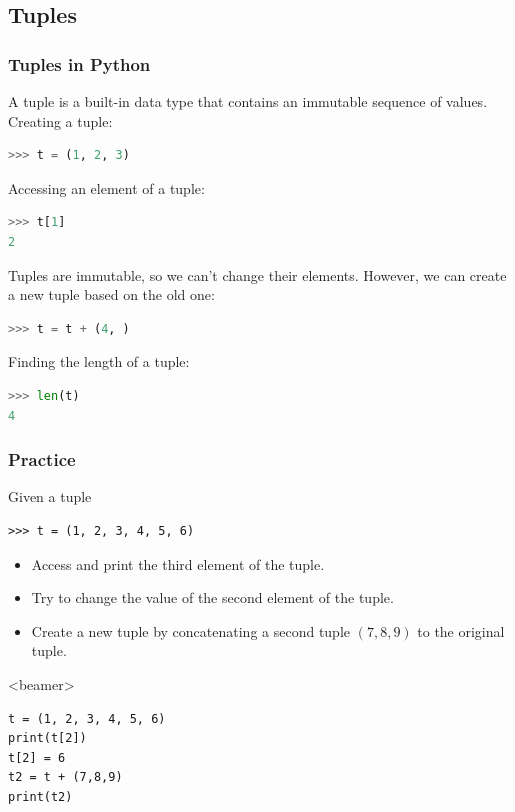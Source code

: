 \subsection{Tuples}
\begin{frame}[fragile]
  \frametitle{Tuples in Python}
  A tuple is a built-in data type that contains an immutable sequence of values. 
  Creating a tuple:
  \begin{lstlisting}[language=Python,numbers=none]
>>> t = (1, 2, 3)
  \end{lstlisting}
  Accessing an element of a tuple:
  \begin{lstlisting}[language=Python,numbers=none]
>>> t[1]
2
  \end{lstlisting}
  Tuples are immutable, so we can't change their elements. However, we can create a new tuple based on the old one:
  \begin{lstlisting}[language=Python,numbers=none]
>>> t = t + (4, )
  \end{lstlisting}
  Finding the length of a tuple:
  \begin{lstlisting}[language=Python,numbers=none]
>>> len(t)
4
  \end{lstlisting}
\end{frame}

\begin{frame}[fragile,label=practice_tuples]
  \frametitle{Practice}
  Given a tuple
  \begin{lstlisting}
>>> t = (1, 2, 3, 4, 5, 6)
  \end{lstlisting}
  \begin{itemize}
   \item Access and print the third element of the tuple.
   \item Try to change the value of the second element of the tuple.
   \item Create a new tuple by concatenating a second tuple \((7, 8, 9)\) to the original tuple.
  \end{itemize}\pause
  \begin{onlyenv}<beamer>
    \begin{lstlisting}[]
t = (1, 2, 3, 4, 5, 6)
print(t[2])
t[2] = 6
t2 = t + (7,8,9)
print(t2)
    \end{lstlisting}
  \end{onlyenv}
 \end{frame}

